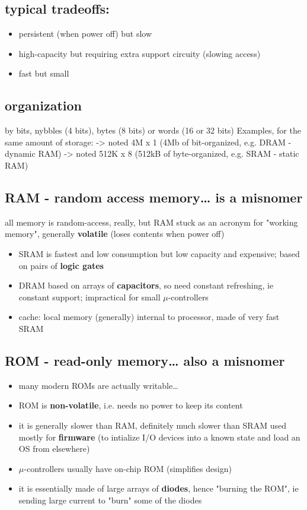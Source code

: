 \documentclass[11pt]{article}
\begin{document}
\subsection{typical tradeoffs:}
\label{sec:org2ff1d0a}
\begin{itemize}
\item persistent (when power off) but slow
\item high-capacity but requiring extra support circuity (slowing access)
\item fast but small
\end{itemize}
\subsection{organization}
\label{sec:org0a0ef3c}
by bits, nybbles (4 bits), bytes (8 bits) or words (16 or 32 bits)
Examples, for the same amount of storage:
-> noted 4M x 1 (4Mb of bit-organized, e.g. DRAM - dynamic RAM)
-> noted 512K x 8 (512kB of byte-organized, e.g. SRAM - static RAM)
\subsection{RAM - random access memory\ldots{} is a misnomer}
\label{sec:org9d7ab17}
all memory is random-access, really, but RAM stuck as an acronym for "working
memory", generally \textbf{\textbf{volatile}} (loses contents when power off)
\begin{itemize}
\item SRAM is fastest and low consumption but low capacity and expensive; based
on pairs of \textbf{logic gates}
\item DRAM based on arrays of \textbf{capacitors}, so need constant refreshing, ie
constant support; impractical for small \(\mu\)-controllers
\item cache: local memory (generally) internal to processor, made of very fast
SRAM
\end{itemize}
\subsection{ROM - read-only memory\ldots{} also a misnomer}
\label{sec:orgdc6b66d}
\begin{itemize}
\item many modern ROMs are actually writable\ldots{}
\item ROM is \textbf{\textbf{non-volatile}}, i.e. needs no power to keep its content
\item it is generally slower than RAM, definitely much slower than SRAM used
mostly for \textbf{\textbf{firmware}} (to intialize I/O devices into a known state and
load an OS from elsewhere)
\item \(\mu\)-controllers usually have on-chip ROM (simplifies design)
\item it is essentially made of large arrays of \textbf{diodes}, hence "burning the
ROM", ie sending large current to "burn" some of the diodes
\end{itemize}
\end{document}
